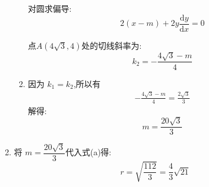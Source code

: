 \begin{questions}
\begin{solution}
\begin{enumerate}[label=\protect\circled{\arabic*}, noitemsep]
\begin{enumerate}[label=\alph*., noitemsep]
				            对圆求偏导:
				            \begin{equation*}
					            2(x-m) + 2y\frac{\text{d}y}{\text{d}x} = 0
				            \end{equation*}

				            点$A(4\sqrt{3},4)$处的切线斜率为:
				            \begin{equation*}
					            k_2 = -\frac{4\sqrt{3} - m}{4}
				            \end{equation*}

				      \item 因为 \( k_1 = k_2 \),所以有
				            \begin{align*}
					            -\frac{4\sqrt{3} - m }{4} = \frac{2\sqrt{3}}{3}
				            \end{align*}
				            解得:
				            \begin{equation*}
					            m = \frac{20\sqrt{3}}{3}
				            \end{equation*}

			      \end{enumerate}

			\item 将 \( m = \dfrac{20\sqrt{3}}{3} \)代入式(a)得:
			      \begin{equation*}
				      r = \sqrt{\dfrac{112}{3}}=\dfrac43\sqrt{21}
			      \end{equation*}

		\end{enumerate}
	\end{solution}


\end{questions}
